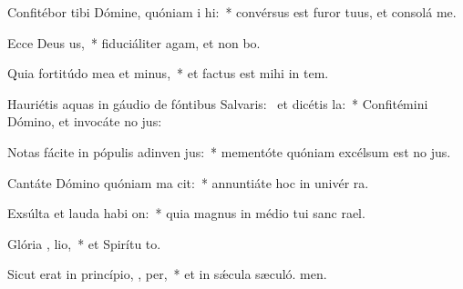 \item Confitébor tibi Dómine, quóniam i  hi:~* convérsus est furor tuus, et consolá  me.
\item Ecce Deus  us,~* fiduciáliter agam, et non bo.
\item Quia fortitúdo mea et   minus,~* et factus est mihi in tem.
\item Hauriétis aquas in gáudio de fóntibus Salvaris:~\pscross{} et dicétis   la:~* Confitémini Dómino, et invocáte no jus:
\item Notas fácite in pópulis adinven jus:~* mementóte quóniam excélsum est no jus.
\item Cantáte Dómino quóniam ma cit:~* annuntiáte hoc in univér ra.
\item Exsúlta et lauda habi on:~* quia magnus in médio tui sanc rael.
\item Glória ,  lio,~* et Spirítu to.
\item Sicut erat in princípio,  ,  per,~* et in sǽcula sæculó. men.
